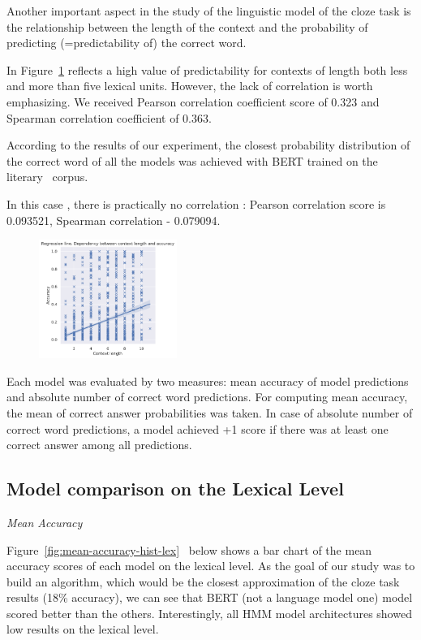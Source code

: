 \documentclass[a4paper]{article}
\newcommand{\head}[1]{\vspace{0.5em}\emph{#1}\vspace{0.25em}}
\begin{document}
Another important aspect in the study of the linguistic model of the cloze task is the relationship between the length of the context and the probability of predicting (=predictability of) the correct word.

In Figure~\ref{fig:context-accuracy-regression} reflects a high value of predictability for contexts of length both less and more than five lexical units. However, the lack of correlation is worth emphasizing. We received Pearson correlation coefficient score of 0.323 and Spearman correlation coefficient of 0.363.

According to the results of our experiment, the closest probability distribution of the correct word of all the models was achieved with BERT trained on the literary
 corpus.

In this case
, there is practically no correlation
: Pearson correlation score is 0.093521, Spearman correlation - 0.079094.

\begin{figure}
\label{fig:context-accuracy-regression}
\centering
\includegraphics[width=0.4\textwidth]{figures/pdf/context-accuracy-regression.pdf}
\end{figure}



Each model was evaluated by two measures: mean accuracy of model predictions and absolute number of correct word predictions. For computing mean accuracy, the mean of correct answer probabilities was taken. In case of absolute number of correct word predictions, a model achieved +1 score if there was at least one correct answer among all predictions.


\subsection{Model comparison on the Lexical Level}

\head{Mean Accuracy}

Figure~\ref{fig:mean-accuracy-hist-lex}
 below shows a bar chart of the mean accuracy scores of each model on
the lexical level. As the goal of our study was to build an algorithm,
which would be the closest approximation of the cloze task results
(18\% accuracy), we can see that BERT (not a language model one) model
scored better than the others. Interestingly, all HMM model
architectures showed low results on the lexical level.
\end{document}

